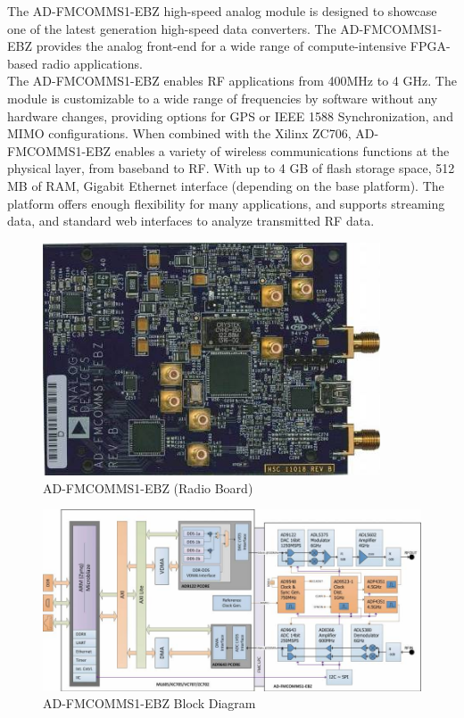 The AD-FMCOMMS1-EBZ \cite{fmcomms1} high-speed analog module is designed to showcase one of the latest generation high-speed data converters. The AD-FMCOMMS1-EBZ provides the analog front-end for a wide range of compute-intensive FPGA-based radio applications.\\
The AD-FMCOMMS1-EBZ enables RF applications from 400MHz to 4 GHz. The module is customizable to a wide range of frequencies by software without any hardware changes, providing options for GPS or IEEE 1588 Synchronization, and MIMO configurations. When combined with the Xilinx ZC706, AD-FMCOMMS1-EBZ enables a variety of wireless communications functions at the physical layer, from baseband to RF. With up to 4 GB of flash storage space, 512 MB of RAM, Gigabit Ethernet interface (depending on the base platform). The platform offers enough flexibility for many applications, and supports streaming data, and standard web interfaces to analyze transmitted RF data.\\

\begin{figure}
\centering
\includegraphics[width=10cm]{content/fig/fmcomms1.jpg}
\caption{AD-FMCOMMS1-EBZ (Radio Board)}
\end{figure}

\begin{figure}
\centering
\includegraphics[width=15cm]{content/fig/fmcomms1Blockdiagram.jpg}
\caption{AD-FMCOMMS1-EBZ Block Diagram}
\label{fig:fmcomms1}
\end{figure}

